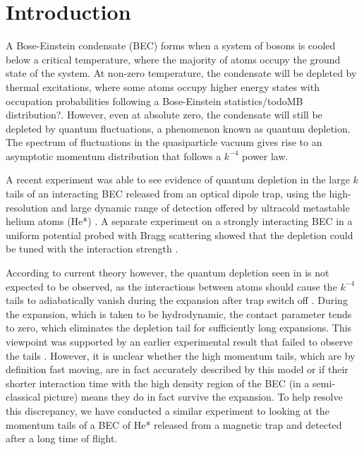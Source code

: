 \documentclass[%
	 aps,%
	 prl,%
	 a4paper,%
	 amsmath,amssymb,%
	 preprint,%
	 reprint,%
]{revtex4-1}
\begin{document}
\section{Introduction}
A Bose-Einstein condensate (BEC) forms when a system of bosons is cooled below a critical temperature, where the majority of atoms occupy the ground state of the system.  At non-zero temperature, the condensate will be depleted by thermal excitations, where some atoms occupy higher energy states with occupation probabilities following a Bose-Einstein statistics/todo{MB distribution?}.  However, even at absolute zero, the condensate will still be depleted by quantum fluctuations, a phenomenon known as quantum depletion.  The spectrum of fluctuations in the quasiparticle vacuum gives rise to an asymptotic momentum distribution that follows a $k^{-4}$ power law\cite{Qu2016}.

A recent experiment \cite{Chang2016} was able to see evidence of quantum depletion in the large $k$ tails of an interacting BEC released from an optical dipole trap, using the high-resolution and large dynamic range of detection offered by ultracold metastable helium atoms (He*) \cite{Vassen2012}.  A separate experiment on a strongly interacting BEC in a uniform potential probed with Bragg scattering showed that the depletion could be tuned with the interaction strength \cite{Lopes2017}.

According to current theory however, the quantum depletion seen in \cite{Chang2016} is not expected to be observed, as the interactions between atoms should cause the $k^{-4}$ tails to adiabatically vanish during the expansion after trap switch off \cite{Qu2016}. 
During the expansion, which is taken to be hydrodynamic, the contact parameter tends to zero, which eliminates the depletion tail for sufficiently long expansions.  This viewpoint was supported by an earlier experimental result that failed to observe the tails \cite{Makotyn2014}.  However, it is unclear whether the high momentum tails, which are by definition fast moving, are in fact accurately described by this model or if their shorter interaction time with the high density region of the BEC (in a semi-classical picture) means they do in fact survive the expansion.  
To help resolve this discrepancy, we have conducted a similar experiment to \cite{Chang2016} looking at the momentum tails of a BEC of He* released from a magnetic trap and detected after a long time of flight.  
\end{document}
